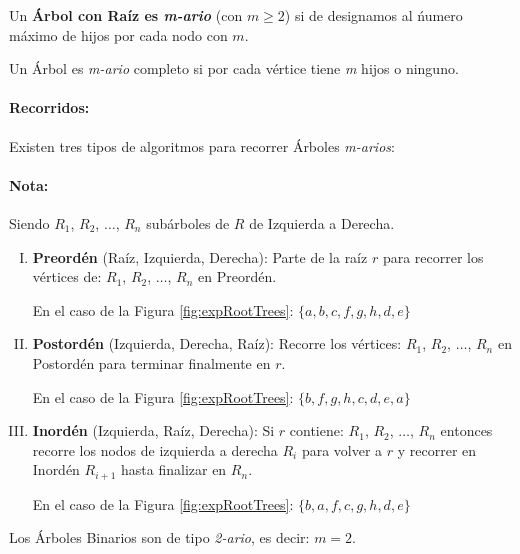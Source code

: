  Un \textbf{Árbol con Raíz es \textit{m-ario}} (con $m \geq 2$) si de 
designamos al ńumero máximo de hijos por cada nodo con $m$.

 Un Árbol es \textit{m-ario} completo si por cada vértice tiene \textit{m} hijos o ninguno.

\paragraph*{Recorridos:}

Existen tres tipos de algoritmos para recorrer Árboles \textit{m-arios}:  



\paragraph*{Nota:} Siendo $R_1$, $R_2$, $\ldots$, $R_n$ subárboles de $R$ de Izquierda a Derecha.

\begin{enumerate}[I.]

\item{ \textbf{Preordén} (Raíz, Izquierda, Derecha): Parte de la raíz $r$ para recorrer los vértices de: 
$R_1$, 
$R_2$, $\ldots$, $R_n$ en Preordén. 

\ejem En el caso de la Figura \ref{fig:expRootTrees}: $\{a,b,c,f,g,h,d,e\}$
}
\item{ \textbf{Postordén} (Izquierda, Derecha, Raíz): Recorre los vértices: $R_1$, $R_2$, $\ldots$, $R_n$ 
en 
Postordén para terminar finalmente en $r$.

\ejem En el caso de la Figura \ref{fig:expRootTrees}: $\{b,f,g,h,c,d,e,a\}$
}
\item{ \textbf{Inordén} (Izquierda, Raíz, Derecha): Si $r$ contiene: $R_1$, $R_2$, $\ldots$, $R_n$ entonces recorre los nodos de 
izquierda a derecha $R_i$ para volver a $r$ y recorrer en Inordén $R_{i+1}$ 
hasta finalizar en $R_{n}$.

\ejem En el caso de la Figura \ref{fig:expRootTrees}: $\{b,a,f,c,g,h,d,e\}$
}

\end{enumerate}

%

{ Los Árboles Binarios son de tipo \textit{2-ario}, es decir: $m=2$.}


